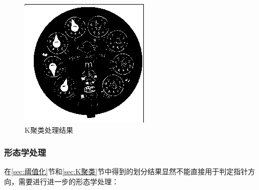\documentclass[a4paper]{ctexart}
\begin{document}
\begin{figure}[htbp]
\begin{minipage}[t]{0.25\textwidth}
		\includegraphics[width=\textwidth]{figure/kmeans/img5.jpg}
	\end{minipage}
	\caption{K聚类处理结果}\label{fig:K聚类}
\end{figure}

\subsubsection{形态学处理}
在\ref{sec:阈值化}节和\ref{sec:K聚类}节中得到的划分结果显然不能直接用于判定指针方向，需要进行进一步的形态学处理：
\end{document}
